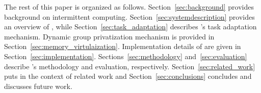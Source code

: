 The rest of this paper is organized as follows. Section~\ref{sec:background} provides background on intermittent computing.
Section~\ref{sec:systemdescription} provides an overview of \sys, while
Section~\ref{sec:task_adaptation} describes \sys's task adaptation mechanism. Dynamic group privatization mechanism is provided in Section~\ref{sec:memory_virtulaization}. Implementation details of \sys are given in Section~\ref{sec:implementation}. Sections~\ref{sec:methodology} and~\ref{sec:evaluation} describe \sys's methodology and evaluation, respectively. Section~\ref{sec:related_work} puts \sys in the
context of related work and Section~\ref{sec:conclusions} concludes and discusses
future work.
